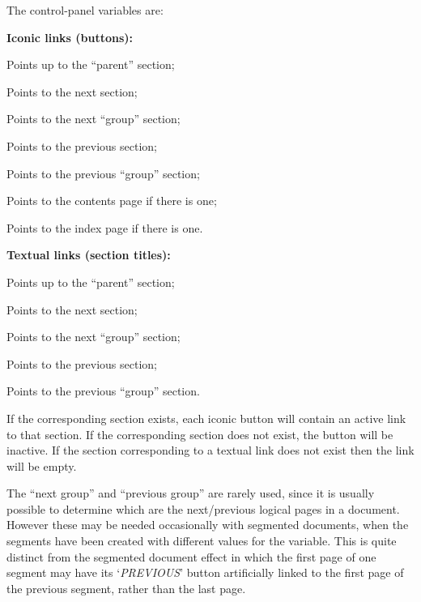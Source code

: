 \medskip\noindent
The control-panel variables are:\nobreak

\medskip\nobreak
{}%
\html{\\}
\noindent
\textbf{Iconic links (buttons):}
\begin{htmllist}\addtolength{\leftskip}{15pt}%
\item [\fn{\$UP}]  Points up to the ``parent'' section;
\item [\fn{\$NEXT}] Points to the next section;
\item [\fn{\$NEXT\_GROUP}] Points to the next ``group'' section;
\item [\fn{\$PREVIOUS}] Points to the previous section;
\item [\fn{\$PREVIOUS\_GROUP}] Points to the previous ``group'' section;
\item [\fn{\$CONTENTS}] Points to the contents page if there is one;
\item [\fn{\$INDEX}] Points to the index page if there is one.
\end{htmllist}

%
\html{\\}\noindent
\textbf{Textual links (section titles):}
\begin{htmllist}\latex{\addtolength{\leftskip}{15pt}}%
\item [\fn{\$UP\_TITLE}]  Points up to the ``parent'' section;
\item [\fn{\$NEXT\_TITLE}] Points to the next section;
\item [\fn{\$NEXT\_GROUP\_TITLE}] Points to the next ``group'' section;
\item [\fn{\$PREVIOUS\_TITLE}] Points to the previous section;
\item [\fn{\$PREVIOUS\_GROUP\_TITLE}] Points to the previous ``group'' section.
\end{htmllist}
If the corresponding section exists, each iconic button will contain an
active link to that section. If the corresponding section does
not exist, the button will be inactive. If the section corresponding
to a textual link does not exist then the link will be empty.

The ``next group'' and ``previous group'' are rarely used, 
since it is usually possible to determine
which are the next/previous logical pages in a document.
However these may be needed occasionally with segmented documents,
when the segments have been created with different values
for the  variable. 
This is quite distinct from the segmented document effect 
in which the first page of one segment may have its `\emph{PREVIOUS}'
button artificially linked to the first page of the previous segment, 
rather than the last page.


